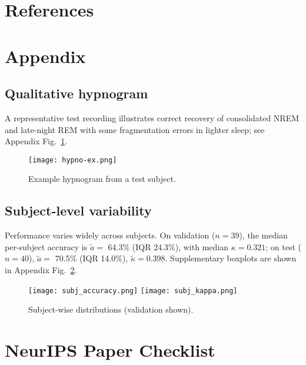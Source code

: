 \documentclass{article}
\begin{document}
\newpage
\section{References}
\nocite{*}



\newpage
\appendix

\section{Appendix}

\subsection{Qualitative hypnogram}
A representative test recording illustrates correct recovery of consolidated NREM and late-night REM with some fragmentation errors in lighter sleep; see Appendix Fig.~\ref{fig:hypno-ex}.

\begin{figure}[t]
  \centering
  \texttt{[image: hypno-ex.png]}
  \caption{Example hypnogram from a test subject.}
  \label{fig:hypno-ex}
\end{figure}

\subsection{Subject-level variability}
Performance varies widely across subjects. On validation (\(n{=}39\)), the median per-subject accuracy is \(\tilde{a}=\) 64.3\% (IQR 24.3\%), with median \(\kappa=0.321\); on test (\(n{=}40\)), \(\tilde{a}=\) 70.5\% (IQR 14.0\%), \(\tilde{\kappa}=0.398\). Supplementary boxplots are shown in Appendix Fig.~\ref{fig:subj-box}.

\begin{figure}[t]
  \centering
  \texttt{[image: subj\_accuracy.png]}\hfill
  \texttt{[image: subj\_kappa.png]}
  \caption{Subject-wise distributions (validation shown).}
  \label{fig:subj-box}
\end{figure}


\newpage
\section*{NeurIPS Paper Checklist}
\end{document}
